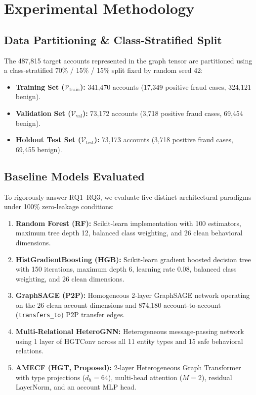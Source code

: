\section{Experimental Methodology}
\label{sec:experiments}

\subsection{Data Partitioning \&  Class-Stratified Split}
The 487,815 target accounts represented in the graph tensor are partitioned using a class-stratified 70\% / 15\% / 15\% split fixed by random seed 42:
\begin{itemize}
    \item \textbf{Training Set ($\mathcal{V}_{\text{train}}$):} 341,470 accounts (17,349 positive fraud cases, 324,121 benign).
    \item \textbf{Validation Set ($\mathcal{V}_{\text{val}}$):} 73,172 accounts (3,718 positive fraud cases, 69,454 benign).
    \item \textbf{Holdout Test Set ($\mathcal{V}_{\text{test}}$):} 73,173 accounts (3,718 positive fraud cases, 69,455 benign).
\end{itemize}

\subsection{Baseline Models Evaluated}
To rigorously answer RQ1--RQ3, we evaluate five distinct architectural paradigms under 100\% zero-leakage conditions:
\begin{enumerate}
    \item \textbf{Random Forest (RF):} Scikit-learn implementation with 100 estimators, maximum tree depth 12, balanced class weighting, and 26 clean behavioral dimensions.
    \item \textbf{HistGradientBoosting (HGB):} Scikit-learn gradient boosted decision tree with 150 iterations, maximum depth 6, learning rate 0.08, balanced class weighting, and 26 clean dimensions.
    \item \textbf{GraphSAGE (P2P):} Homogeneous 2-layer GraphSAGE network operating on the 26 clean account dimensions and 874,180 account-to-account (\texttt{transfers\_to}) P2P transfer edges.
    \item \textbf{Multi-Relational HeteroGNN:} Heterogeneous message-passing network using 1 layer of HGTConv across all 11 entity types and 15 safe behavioral relations.
    \item \textbf{AMECF (HGT, Proposed):} 2-layer Heterogeneous Graph Transformer with type projections ($d_h = 64$), multi-head attention ($M = 2$), residual LayerNorm, and an account MLP head.
\end{enumerate}

